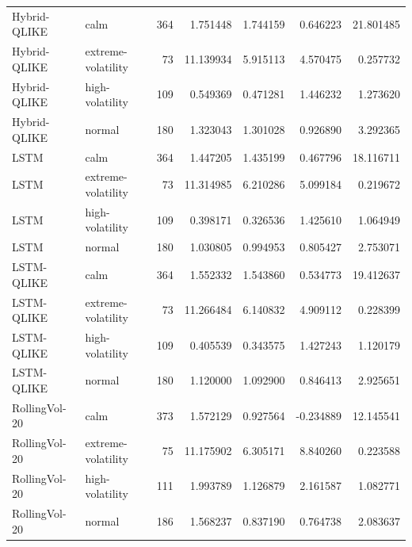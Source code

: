\begin{tabular}{l l r r r r r}
Hybrid-QLIKE & calm & 364 & 1.751448 & 1.744159 & 0.646223 & 21.801485 \\
Hybrid-QLIKE & extreme-volatility & 73 & 11.139934 & 5.915113 & 4.570475 & 0.257732 \\
Hybrid-QLIKE & high-volatility & 109 & 0.549369 & 0.471281 & 1.446232 & 1.273620 \\
Hybrid-QLIKE & normal & 180 & 1.323043 & 1.301028 & 0.926890 & 3.292365 \\
LSTM & calm & 364 & 1.447205 & 1.435199 & 0.467796 & 18.116711 \\
LSTM & extreme-volatility & 73 & 11.314985 & 6.210286 & 5.099184 & 0.219672 \\
LSTM & high-volatility & 109 & 0.398171 & 0.326536 & 1.425610 & 1.064949 \\
LSTM & normal & 180 & 1.030805 & 0.994953 & 0.805427 & 2.753071 \\
LSTM-QLIKE & calm & 364 & 1.552332 & 1.543860 & 0.534773 & 19.412637 \\
LSTM-QLIKE & extreme-volatility & 73 & 11.266484 & 6.140832 & 4.909112 & 0.228399 \\
LSTM-QLIKE & high-volatility & 109 & 0.405539 & 0.343575 & 1.427243 & 1.120179 \\
LSTM-QLIKE & normal & 180 & 1.120000 & 1.092900 & 0.846413 & 2.925651 \\
RollingVol-20 & calm & 373 & 1.572129 & 0.927564 & -0.234889 & 12.145541 \\
RollingVol-20 & extreme-volatility & 75 & 11.175902 & 6.305171 & 8.840260 & 0.223588 \\
RollingVol-20 & high-volatility & 111 & 1.993789 & 1.126879 & 2.161587 & 1.082771 \\
RollingVol-20 & normal & 186 & 1.568237 & 0.837190 & 0.764738 & 2.083637 \\
\hline
\end{tabular}
